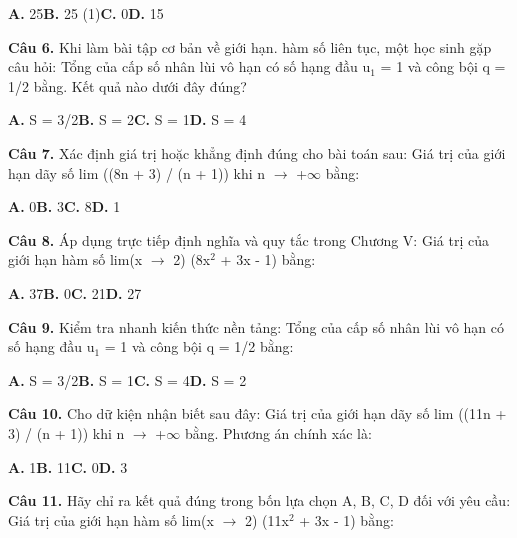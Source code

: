\documentclass[11pt,a4paper]{article}
\begin{document}
\hspace*{1.5em}\textbf{A.} 25\quad\quad \textbf{B.} 25 (1)\quad\quad \textbf{C.} 0\quad\quad \textbf{D.} 15\par\vspace{2pt}
\textbf{\color{primary} Câu 6.} Khi làm bài tập cơ bản về giới hạn. hàm số liên tục, một học sinh gặp câu hỏi: Tổng của cấp số nhân lùi vô hạn có số hạng đầu u$_1$ = 1 và công bội q = 1/2 bằng. Kết quả nào dưới đây đúng?\par
\hspace*{1.5em}\textbf{A.} S = 3/2\quad\quad \textbf{B.} S = 2\quad\quad \textbf{C.} S = 1\quad\quad \textbf{D.} S = 4\par\vspace{2pt}
\textbf{\color{primary} Câu 7.} Xác định giá trị hoặc khẳng định đúng cho bài toán sau: Giá trị của giới hạn dãy số lim ((8n + 3) / (n + 1)) khi n $\to$ +$\infty$ bằng:\par
\hspace*{1.5em}\textbf{A.} 0\quad\quad \textbf{B.} 3\quad\quad \textbf{C.} 8\quad\quad \textbf{D.} 1\par\vspace{2pt}
\textbf{\color{primary} Câu 8.} Áp dụng trực tiếp định nghĩa và quy tắc trong Chương V: Giá trị của giới hạn hàm số lim(x $\to$ 2) (8x$^2$ + 3x - 1) bằng:\par
\hspace*{1.5em}\textbf{A.} 37\quad\quad \textbf{B.} 0\quad\quad \textbf{C.} 21\quad\quad \textbf{D.} 27\par\vspace{2pt}
\textbf{\color{primary} Câu 9.} Kiểm tra nhanh kiến thức nền tảng: Tổng của cấp số nhân lùi vô hạn có số hạng đầu u$_1$ = 1 và công bội q = 1/2 bằng:\par
\hspace*{1.5em}\textbf{A.} S = 3/2\quad\quad \textbf{B.} S = 1\quad\quad \textbf{C.} S = 4\quad\quad \textbf{D.} S = 2\par\vspace{2pt}
\textbf{\color{primary} Câu 10.} Cho dữ kiện nhận biết sau đây: Giá trị của giới hạn dãy số lim ((11n + 3) / (n + 1)) khi n $\to$ +$\infty$ bằng. Phương án chính xác là:\par
\hspace*{1.5em}\textbf{A.} 1\quad\quad \textbf{B.} 11\quad\quad \textbf{C.} 0\quad\quad \textbf{D.} 3\par\vspace{2pt}
\textbf{\color{primary} Câu 11.} Hãy chỉ ra kết quả đúng trong bốn lựa chọn A, B, C, D đối với yêu cầu: Giá trị của giới hạn hàm số lim(x $\to$ 2) (11x$^2$ + 3x - 1) bằng:\par
\end{document}
